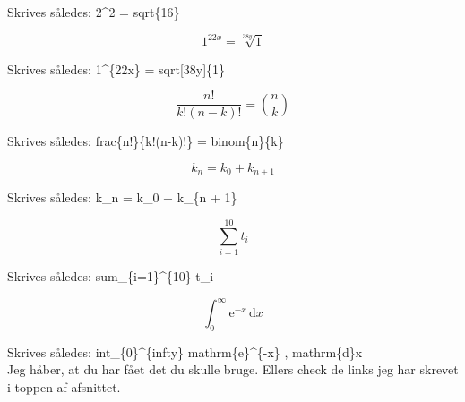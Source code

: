 \noindent
Skrives således: 2\^{}2 = \bs sqrt\{16\}

\[ 1^{22x} = \sqrt[38y]{1} \]

\noindent
Skrives således: 1\^{}\{22x\} = \bs sqrt[38y]\{1\}

\[ \frac{n!}{k!(n-k)!} = \binom{n}{k} \]

\noindent
Skrives således: \bs frac\{n!\}\{k!(n-k)!\} = \bs binom\{n\}\{k\}

\[ k_n = k_0 + k_{n + 1} \]

\noindent
Skrives således: k\_n = k\_0 + k\_\{n + 1\}

\[ \sum_{i=1}^{10} t_i \]

\noindent
Skrives således: \bs sum\_\{i=1\}\^{}\{10\} t\_i

\[ \int_{0}^{\infty} \mathrm{e}^{-x} \, \mathrm{d}x \]

\noindent
Skrives således: \bs int\_\{0\}\^{}\{\bs infty\} \bs mathrm\{e\}\^{}\{-x\} \bs , \bs mathrm\{d\}x\\

\noindent
Jeg håber, at du har fået det du skulle bruge. Ellers check de links jeg har skrevet i toppen af afsnittet.